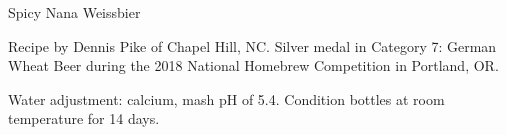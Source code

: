 \begin{recipe}{Spicy Nana Weissbier}

\begin{aboutblock}
Recipe by Dennis Pike of Chapel Hill, NC. Silver medal in Category 7: German Wheat
Beer during the 2018 National Homebrew Competition in Portland, OR. \sourceaha
\end{aboutblock}


\begin{methodandtiming}
 
\begin{mashsteps}
\end{mashsteps}

\begin{fermentationsteps}
\end{fermentationsteps}

\begin{directions}
Water adjustment:  calcium, mash pH of 5.4. Condition bottles at
room temperature for 14 days.
\end{directions}

\end{methodandtiming}

\recipebreak

\begin{ingredientsblock}

\begin{malts}
\end{malts}

\begin{hops}
\end{hops}


\begin{twists}
\end{twists}

\end{ingredientsblock}

\end{recipe}

